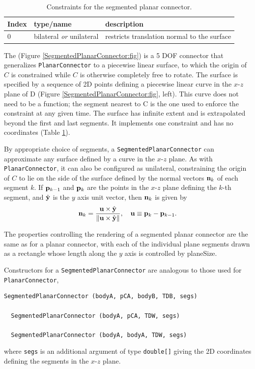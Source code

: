 \begin{table}[h]
\centering
\begin{tabular}{|l|l|l|}
\hline
Index & type/name & description \\
\hline
0 & bilateral {\it or} unilateral & restricts translation normal to the surface \\
\hline
\end{tabular}
\caption{Constraints for the segmented planar connector.}
\label{SegmentedPlanarConstraints:tbl}
\end{table}

The 
(Figure \ref{SegmentedPlanarConnector:fig}) is a 5 DOF connector that
generalizes {\tt PlanarConnector} to a piecewise linear surface, to
which the origin of $C$ is constrained while $C$ is otherwise
completely free to rotate. The surface is specified by a sequence of
2D points defining a piecewise linear curve in the $x$-$z$ plane of D
(Figure \ref{SegmentedPlanarConnector:fig}, left). This curve does not
need to be a function; the segment nearest to C is the one used to
enforce the constraint at any given time. The surface has infinite
extent and is extrapolated beyond the first and last segments.  It
implements one constraint and has no coordinates (Table
\ref{SegmentedPlanarConstraints:tbl}).

By appropriate choice of segments, a {\tt SegmentedPlanarConnector}
can approximate any surface defined by a curve in the $x$-$z$ plane.
As with {\tt PlanarConnector}, it can also be configured as
unilateral, constraining the origin of $C$ to lie on the side of the
surface defined by the normal vectors ${\bf n}_k$ of each segment $k$. If
${\bf p}_{k-1}$ and ${\bf p}_k$ are the points in the $x$-$z$ plane defining the
$k$-th segment, and $\hat{{\bf y}}$ is the $y$ axis unit vector, then ${\bf n}_k$
is given by
%
\begin{equation}
{\bf n}_k = \frac{{\bf u} \times \hat{{\bf y}}}{\| {\bf u} \times \hat{{\bf y}}\|},
\quad {\bf u} \equiv {\bf p}_{k} -{\bf p}_{k-1}.
\end{equation}
%

The properties controlling the rendering of a segmented planar
connector are the same as for a planar connector, with each of the
individual plane segments drawn as a rectangle whose length along the
$y$ axis is controlled by {\sf planeSize}.

Constructors for a {\tt SegmentedPlanarConnector} are analogous to
those used for {\tt PlanarConnector},
%
\begin{lstlisting}[]
  SegmentedPlanarConnector (bodyA, pCA, bodyB, TDB, segs)

  SegmentedPlanarConnector (bodyA, pCA, TDW, segs)

  SegmentedPlanarConnector (bodyA, bodyA, TDW, segs)
\end{lstlisting}
%
where {\tt segs} is an additional argument of type {\tt double[]}
giving the 2D coordinates defining the segments in the $x$-$z$ plane.

